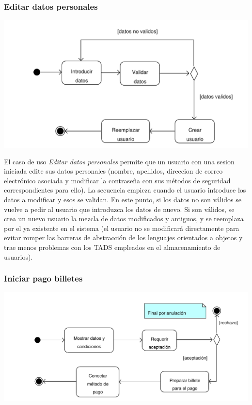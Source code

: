 \documentclass[11pt, a4paper, twoside, titlepage]{article}
\begin{document}
			\subsubsection{Editar datos personales}
				\begin{center}
					\includegraphics[scale=.86]{analisis/diagramas/da_editardatospersonales.pdf}
				\end{center}
				El caso de uso {\itshape Editar datos personales} permite que un usuario con una sesion iniciada edite sus datos personales (nombre, apellidos, direccion de correo electrónico asociada y modificar la contraseña con sus métodos de seguridad correspondientes para ello). 
				La secuencia empieza cuando el usuario introduce los datos a modificar y esos se validan. En este punto, si los datos no son válidos se vuelve a pedir al usuario que introduzca los datos de nuevo. Si son válidos, se crea un nuevo usuario la mezcla de datos modificados y antiguos, y se reemplaza por el ya existente en el sistema (el usuario no se modificará directamente para evitar romper las barreras de abstracción de los lenguajes orientados a objetos y trae menos problemas con los TADS empleados en el almacenamiento de usuarios).

			\subsubsection{Iniciar pago billetes}
				\begin{center}
					\includegraphics[scale=.76]{analisis/diagramas/da_iniciarpagobilletes.pdf}
				\end{center}
\end{document}
